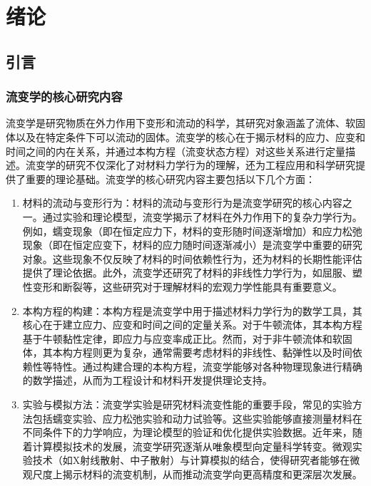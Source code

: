 \chapter{绪论}

\section{引言}
\subsection{流变学的核心研究内容}
流变学是研究物质在外力作用下变形和流动的科学，其研究对象涵盖了流体、软固体以及在特定条件下可以流动的固体\cite{dealyIntroductionRheology1990}。流变学的核心在于揭示材料的应力、应变和时间之间的内在关系，并通过本构方程（流变状态方程）对这些关系进行定量描述。流变学的研究不仅深化了对材料力学行为的理解，还为工程应用和科学研究提供了重要的理论基础。流变学的核心研究内容主要包括以下几个方面\cite{elleroTanner90Years2024,ewoldtDesigningComplexFluids2022}：
\begin{enumerate}[topsep = 0 pt, itemsep= 0 pt, parsep=0pt, partopsep=0pt, leftmargin=44pt, itemindent=0pt, labelsep=6pt, label=(\arabic*)]
	\item 材料的流动与变形行为：材料的流动与变形行为是流变学研究的核心内容之一。通过实验和理论模型，流变学揭示了材料在外力作用下的复杂力学行为。例如，蠕变现象（即在恒定应力下，材料的变形随时间逐渐增加）和应力松弛现象（即在恒定应变下，材料的应力随时间逐渐减小）是流变学中重要的研究对象\cite{BARNES19971,banerjeeRoleRheologyMorphology2023}。这些现象不仅反映了材料的时间依赖性行为，还为材料的长期性能评估提供了理论依据。此外，流变学还研究了材料的非线性力学行为，如屈服、塑性变形和断裂等，这些研究对于理解材料的宏观力学性能具有重要意义\cite{zenerElasticityAnelasticityMetals1949,hajikarimiViscoelasticityTheoreticalBackground2023}。
	\item	  本构方程的构建：本构方程是流变学中用于描述材料力学行为的数学工具，其核心在于建立应力、应变和时间之间的定量关系。对于牛顿流体，其本构方程基于牛顿黏性定律，即应力与应变率成正比\cite{elleroTanner90Years2024}。然而，对于非牛顿流体和软固体，其本构方程则更为复杂，通常需要考虑材料的非线性、黏弹性以及时间依赖性等特性\cite{sunReviewConstitutiveModels2024}。通过构建合理的本构方程，流变学能够对各种物理现象进行精确的数学描述，从而为工程设计和材料开发提供理论支持。
	\item  实验与模拟方法：流变学实验是研究材料流变性能的重要手段，常见的实验方法包括蠕变实验、应力松弛实验和动力试验等\cite{ewoldtDesigningComplexFluids2022}。这些实验能够直接测量材料在不同条件下的力学响应，为理论模型的验证和优化提供实验数据。近年来，随着计算模拟技术的发展，流变学研究逐渐从唯象模型向定量科学转变。微观实验技术（如X射线散射、中子散射）与计算模拟的结合，使得研究者能够在微观尺度上揭示材料的流变机制，从而推动流变学向更高精度和更深层次发展\cite{kuschelNonlinearEnhancementUltrafast2025,sun2022relaxation}。
\end{enumerate}
